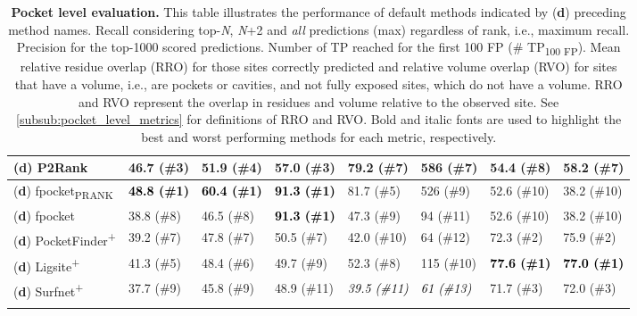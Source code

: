 \begin{landscape}
\begin{longtable}[c]{|M{29mm}|M{29mm}|M{31mm}|M{27mm}|M{30mm}|M{19mm}|M{18mm}|M{18mm}|}
\footnotesize{(\textbf{d})} P2Rank         & 46.7 (\#3)            & 51.9 (\#4)             & 57.0 (\#3)           & 79.2 (\#7)           & 586 (\#7)         & 54.4 (\#8)     & 58.2 (\#7)   \\ \hline
\footnotesize{(\textbf{d})} fpocket\textsubscript{PRANK}        & \textbf{\textcolor{black}{48.8 (\#1)}}           & \textbf{\textcolor{black}{60.4 (\#1)}}             & \textbf{\textcolor{black}{91.3 (\#1)}}         & 81.7 (\#5)           & 526 (\#9)          & 52.6 (\#10)     & 38.2 (\#10)     \\ \hline
\footnotesize{(\textbf{d})} fpocket        & 38.8 (\#8)           & 46.5 (\#8)             & \textbf{\textcolor{black}{91.3 (\#1)}}         & 47.3 (\#9)           & 94 (\#11)          & 52.6 (\#10)     & 38.2 (\#10)     \\ \hline
\footnotesize{(\textbf{d})} PocketFinder\textsuperscript{+}  & 39.2 (\#7)           & 47.8 (\#7)             & 50.5 (\#7)         & 42.0 (\#10)             & 64 (\#12)          & 72.3 (\#2)     & 75.9 (\#2)     \\ \hline
\footnotesize{(\textbf{d})} Ligsite\textsuperscript{+}       & 41.3 (\#5)           & 48.4 (\#6)             & 49.7 (\#9)         & 52.3 (\#8)           & 115 (\#10)         & \textbf{\textcolor{black}{77.6 (\#1)}}             & \textbf{\textcolor{black}{77.0 (\#1)}}             \\ \hline
\footnotesize{(\textbf{d})} Surfnet\textsuperscript{+}       & 37.7 (\#9)           & 45.8 (\#9)             & 48.9 (\#11)         & \textit{\textcolor{black}{39.5 (\#11)}}           & \textit{\textcolor{black}{61 (\#13)}}                  & 71.7 (\#3)     & 72.0 (\#3)     \\ \hline
\caption[Pocket level evaluation]{\textbf{Pocket level evaluation.} This table illustrates the performance of default methods indicated by (\textbf{d}) preceding method names. Recall considering top-\textit{N}, \textit{N}+2 and \textit{all} predictions (max) regardless of rank, i.e., maximum recall. Precision for the top-1000 scored predictions. Number of TP reached for the first 100 FP (\# TP\textsubscript{100 FP}). Mean relative residue overlap (RRO) for those sites correctly predicted and relative volume overlap (RVO) for sites that have a volume, i.e., are pockets or cavities, and not fully exposed sites, which do not have a volume. RRO and RVO represent the overlap in residues and volume relative to the observed site. See \autoref{subsub:pocket_level_metrics} for definitions of RRO and RVO. Bold and italic fonts are used to highlight the best and worst performing methods for each metric, respectively.}
\label{tab:pocket_level_benchmark}\\
\end{longtable}
\end{landscape}
\endgroup

